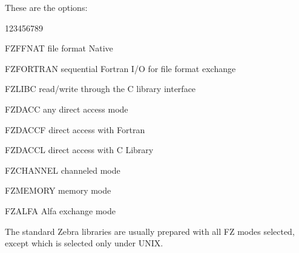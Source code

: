 These are the options:
\begin{DLtt}{123456789}
\item[FZFFNAT]   file format Native
\item[FZFORTRAN] sequential Fortran I/O for file format exchange
\item[FZLIBC]    read/write through the C library interface
\item[FZDACC]    any direct access mode
\item[FZDACCF]   direct access with Fortran
\item[FZDACCL]   direct access with C Library
\item[FZCHANNEL] channeled mode
\item[FZMEMORY]  memory mode
\item[FZALFA]    Alfa exchange mode
\end{DLtt}

The standard Zebra libraries are usually prepared with all
FZ modes selected, except  which is selected only under UNIX.
